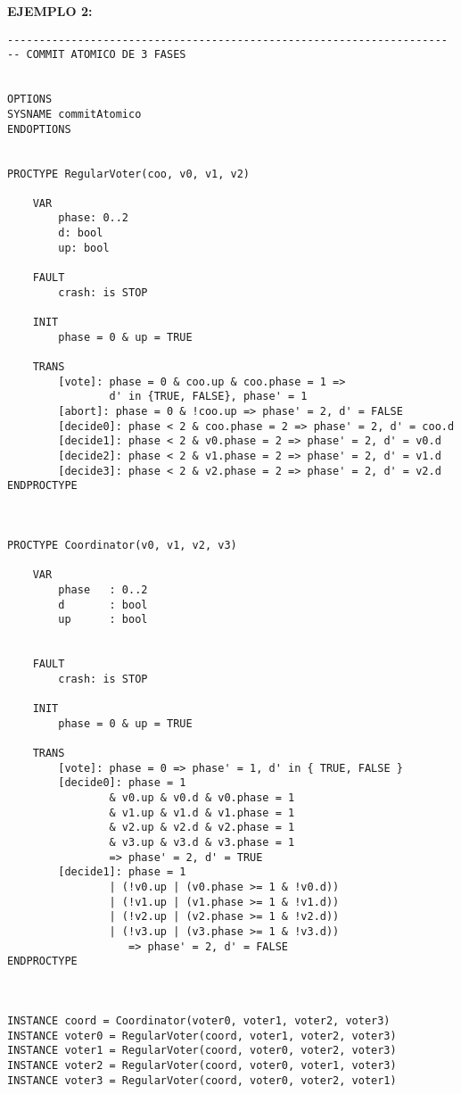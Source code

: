 \documentclass[titlepage, 12pt]{book}
\begin{document}
\textbf{EJEMPLO 2:}\\

\begin{verbatim}
---------------------------------------------------------------------
-- COMMIT ATOMICO DE 3 FASES


OPTIONS
SYSNAME commitAtomico
ENDOPTIONS


PROCTYPE RegularVoter(coo, v0, v1, v2)
    
    VAR
        phase: 0..2
        d: bool
        up: bool

    FAULT
        crash: is STOP
    
    INIT
        phase = 0 & up = TRUE

    TRANS
        [vote]: phase = 0 & coo.up & coo.phase = 1 =>
                d' in {TRUE, FALSE}, phase' = 1
        [abort]: phase = 0 & !coo.up => phase' = 2, d' = FALSE
        [decide0]: phase < 2 & coo.phase = 2 => phase' = 2, d' = coo.d
        [decide1]: phase < 2 & v0.phase = 2 => phase' = 2, d' = v0.d
        [decide2]: phase < 2 & v1.phase = 2 => phase' = 2, d' = v1.d
        [decide3]: phase < 2 & v2.phase = 2 => phase' = 2, d' = v2.d
ENDPROCTYPE



PROCTYPE Coordinator(v0, v1, v2, v3)

    VAR
        phase   : 0..2
        d       : bool
        up      : bool

    
    FAULT 
        crash: is STOP

    INIT
        phase = 0 & up = TRUE

    TRANS
        [vote]: phase = 0 => phase' = 1, d' in { TRUE, FALSE }
        [decide0]: phase = 1 
                & v0.up & v0.d & v0.phase = 1 
                & v1.up & v1.d & v1.phase = 1
                & v2.up & v2.d & v2.phase = 1
                & v3.up & v3.d & v3.phase = 1
                => phase' = 2, d' = TRUE
        [decide1]: phase = 1 
                | (!v0.up | (v0.phase >= 1 & !v0.d)) 
                | (!v1.up | (v1.phase >= 1 & !v1.d)) 
                | (!v2.up | (v2.phase >= 1 & !v2.d)) 
                | (!v3.up | (v3.phase >= 1 & !v3.d))
                   => phase' = 2, d' = FALSE
ENDPROCTYPE



INSTANCE coord = Coordinator(voter0, voter1, voter2, voter3)
INSTANCE voter0 = RegularVoter(coord, voter1, voter2, voter3)
INSTANCE voter1 = RegularVoter(coord, voter0, voter2, voter3)
INSTANCE voter2 = RegularVoter(coord, voter0, voter1, voter3)
INSTANCE voter3 = RegularVoter(coord, voter0, voter2, voter1)




\end{verbatim}
\end{document}
